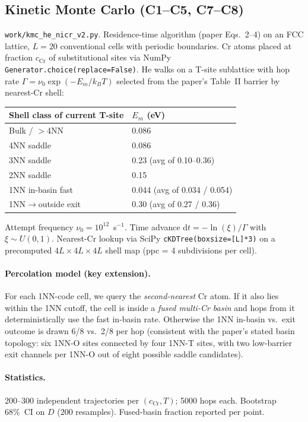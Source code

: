 \documentclass[11pt]{article}
\begin{document}
\subsection{Kinetic Monte Carlo (C1--C5, C7--C8)}
\texttt{work/kmc\_he\_nicr\_v2.py}. Residence-time algorithm (paper
Eqs.~2--4) on an FCC lattice, $L=20$ conventional cells with periodic
boundaries. Cr atoms placed at fraction $c_\text{Cr}$ of substitutional
sites via NumPy \texttt{Generator.choice(replace=False)}. He walks on a
T-site sublattice with hop rate $\Gamma = \nu_0 \exp(-E_m/k_B T)$
selected from the paper's Table~II barrier by nearest-Cr shell:

\begin{center}
\begin{tabular}{ll}
\toprule
Shell class of current T-site & $E_m$ (eV) \\
\midrule
Bulk / $>$4NN     & 0.086 \\
4NN saddle        & 0.086 \\
3NN saddle        & 0.23 (avg of 0.10--0.36) \\
2NN saddle        & 0.15 \\
1NN in-basin fast & 0.044 (avg of 0.034 / 0.054) \\
1NN$\to$outside exit & 0.30 (avg of 0.27 / 0.36) \\
\bottomrule
\end{tabular}
\end{center}

Attempt frequency $\nu_0 = 10^{12}$~s$^{-1}$.  Time advance
$\mathrm{d}t = -\ln(\xi)/\Gamma$ with $\xi \sim U(0,1)$.  Nearest-Cr
lookup via SciPy \texttt{cKDTree(boxsize=[L]*3)} on a precomputed
$4L \times 4L \times 4L$ shell map (ppc = 4 subdivisions per cell).

\paragraph{Percolation model (key extension).} For each 1NN-code cell,
we query the \emph{second-nearest} Cr atom. If it also lies within the
1NN cutoff, the cell is inside a \emph{fused multi-Cr basin} and hops
from it deterministically use the fast in-basin rate. Otherwise the
1NN in-basin vs.\ exit outcome is drawn 6/8 vs.\ 2/8 per hop
(consistent with the paper's stated basin topology: six 1NN-O sites
connected by four 1NN-T sites, with two low-barrier exit channels per
1NN-O out of eight possible saddle candidates).

\paragraph{Statistics.} 200--300 independent trajectories per
$(c_\text{Cr}, T)$; 5000 hops each. Bootstrap 68\%~CI on $D$ (200
resamples). Fused-basin fraction reported per point.
\end{document}
